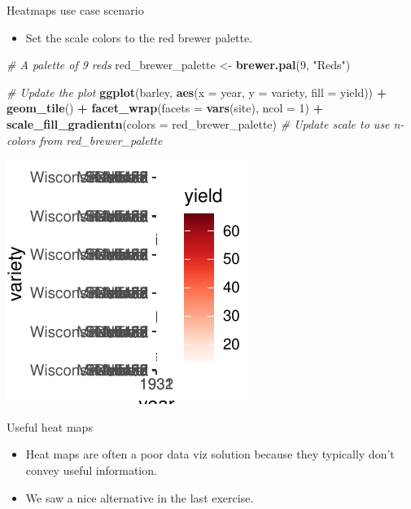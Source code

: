 \documentclass[
  ignorenonframetext,
]{beamer}
\newenvironment{Shaded}{\begin{snugshade}}{\end{snugshade}}
\newcommand{\AttributeTok}[1]{\textcolor[rgb]{0.13,0.29,0.53}{#1}}
\newcommand{\CommentTok}[1]{\textcolor[rgb]{0.56,0.35,0.01}{\textit{#1}}}
\newcommand{\DecValTok}[1]{\textcolor[rgb]{0.00,0.00,0.81}{#1}}
\newcommand{\FunctionTok}[1]{\textcolor[rgb]{0.13,0.29,0.53}{\textbf{#1}}}
\newcommand{\NormalTok}[1]{#1}
\newcommand{\OtherTok}[1]{\textcolor[rgb]{0.56,0.35,0.01}{#1}}
\newcommand{\SpecialCharTok}[1]{\textcolor[rgb]{0.81,0.36,0.00}{\textbf{#1}}}
\newcommand{\StringTok}[1]{\textcolor[rgb]{0.31,0.60,0.02}{#1}}
\providecommand{\tightlist}{%
  \setlength{\itemsep}{0pt}\setlength{\parskip}{0pt}}
\begin{document}
\begin{frame}[fragile]{Heatmaps use case scenario}
\label{heatmaps-use-case-scenario-8}
\begin{itemize}
\tightlist
\item
  Set the scale colors to the red brewer palette.
\end{itemize}


\begin{Shaded}
\begin{Highlighting}[]
\CommentTok{\# A palette of 9 reds}
\NormalTok{red\_brewer\_palette }\OtherTok{\textless{}{-}} \FunctionTok{brewer.pal}\NormalTok{(}\DecValTok{9}\NormalTok{, }\StringTok{"Reds"}\NormalTok{)}

\CommentTok{\# Update the plot}
\FunctionTok{ggplot}\NormalTok{(barley, }\FunctionTok{aes}\NormalTok{(}\AttributeTok{x =}\NormalTok{ year, }\AttributeTok{y =}\NormalTok{ variety, }\AttributeTok{fill =}\NormalTok{ yield)) }\SpecialCharTok{+} \FunctionTok{geom\_tile}\NormalTok{() }\SpecialCharTok{+}
    \FunctionTok{facet\_wrap}\NormalTok{(}\AttributeTok{facets =} \FunctionTok{vars}\NormalTok{(site), }\AttributeTok{ncol =} \DecValTok{1}\NormalTok{) }\SpecialCharTok{+} \FunctionTok{scale\_fill\_gradientn}\NormalTok{(}\AttributeTok{colors =}\NormalTok{ red\_brewer\_palette)  }\CommentTok{\# Update scale to use n{-}colors from red\_brewer\_palette}
\end{Highlighting}
\end{Shaded}

\begin{center}\includegraphics[width=0.5\linewidth]{Figs/unnamed-chunk-115-1} \end{center}
\end{frame}

\begin{frame}{Useful heat maps}
\label{useful-heat-maps}
\begin{itemize}
\item
  Heat maps are often a poor data viz solution because they typically
  don't convey useful information.
\item
  We saw a nice alternative in the last exercise.
\end{itemize}
\end{frame}
\end{document}
